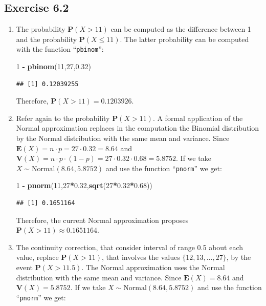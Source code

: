\documentclass[]{krantz}
\makeatletter
\newenvironment{Shaded}{\begin{snugshade}}{\end{snugshade}}
\newcommand{\DecValTok}[1]{\textcolor[rgb]{0.00,0.00,0.81}{#1}}
\newcommand{\FloatTok}[1]{\textcolor[rgb]{0.00,0.00,0.81}{#1}}
\newcommand{\KeywordTok}[1]{\textcolor[rgb]{0.13,0.29,0.53}{\textbf{#1}}}
\newcommand{\NormalTok}[1]{#1}
\newcommand{\OperatorTok}[1]{\textcolor[rgb]{0.81,0.36,0.00}{\textbf{#1}}}
\newcommand{\StringTok}[1]{\textcolor[rgb]{0.31,0.60,0.02}{#1}}
\newcommand{\Expec}{\mathbf{E}}
\newcommand{\Prob}{\mathbf{P}}
\newcommand{\Var}{\mathbf{V}}
\newenvironment{kframe}{%
\medskip{}
\setlength{\fboxsep}{.8em}
 \def\at@end@of@kframe{}%
 \ifinner\ifhmode%
  \def\at@end@of@kframe{\end{minipage}}%
  \begin{minipage}{\columnwidth}%
 \fi\fi%
 \def\FrameCommand##1{\hskip\@totalleftmargin \hskip-\fboxsep
 \colorbox{shadecolor}{##1}\hskip-\fboxsep
     \hskip-\linewidth \hskip-\@totalleftmargin \hskip\columnwidth}%
 \MakeFramed {\advance\hsize-\width
   \@totalleftmargin\z@ \linewidth\hsize
   \@setminipage}}%
 {\par\unskip\endMakeFramed%
 \at@end@of@kframe}
\renewenvironment{Shaded}{\begin{kframe}}{\end{kframe}}
\theoremstyle{definition}
\theoremstyle{definition}
\theoremstyle{definition}
\theoremstyle{remark}
\makeatother
\begin{document}
\hypertarget{exercise-6.2}{%
\subsection*{Exercise 6.2}\label{exercise-6.2}}


\begin{enumerate}
\def\labelenumi{\arabic{enumi}.}
\item
  The probability \(\Prob(X > 11)\) can be
  computed as the difference between 1 and the probability
  \(\Prob(X \leq 11)\). The latter probability can be computed with the
  function ``\texttt{pbinom}'':

\begin{Shaded}
\begin{Highlighting}[]
\DecValTok{1} \OperatorTok{-}\StringTok{ }\KeywordTok{pbinom}\NormalTok{(}\DecValTok{11}\NormalTok{,}\DecValTok{27}\NormalTok{,}\FloatTok{0.32}\NormalTok{)}
\end{Highlighting}
\end{Shaded}

\begin{verbatim}
## [1] 0.12039255
\end{verbatim}

  Therefore, \(\Prob(X > 11) = 0.1203926\).
\item
  Refer again to the probability
  \(\Prob(X > 11)\). A formal application of the Normal approximation
  replaces in the computation the Binomial distribution by the Normal
  distribution with the same mean and variance. Since
  \(\Expec(X) = n \cdot p = 27 \cdot 0.32 = 8.64\) and
  \(\Var(X) = n \cdot p \cdot (1-p) = 27 \cdot 0.32 \cdot 0.68 = 5.8752\).
  If we take \(X \sim \mbox{Normal}(8.64,5.8752)\) and use the function
  ``\texttt{pnorm}'' we get:

\begin{Shaded}
\begin{Highlighting}[]
\DecValTok{1} \OperatorTok{-}\StringTok{ }\KeywordTok{pnorm}\NormalTok{(}\DecValTok{11}\NormalTok{,}\DecValTok{27}\OperatorTok{*}\FloatTok{0.32}\NormalTok{,}\KeywordTok{sqrt}\NormalTok{(}\DecValTok{27}\OperatorTok{*}\FloatTok{0.32}\OperatorTok{*}\FloatTok{0.68}\NormalTok{))}
\end{Highlighting}
\end{Shaded}

\begin{verbatim}
## [1] 0.1651164
\end{verbatim}

  Therefore, the current Normal approximation proposes
  \(\Prob(X > 11) \approx 0.1651164\).
\item
  The continuity correction, that
  consider interval of range 0.5 about each value, replace
  \(\Prob(X > 11)\), that involves the values \(\{12, 13, \ldots, 27\}\), by
  the event \(\Prob(X > 11.5)\). The Normal approximation uses the Normal
  distribution with the same mean and variance. Since \(\Expec(X) = 8.64\)
  and \(\Var(X) = 5.8752\). If we take \(X \sim \mbox{Normal}(8.64,5.8752)\)
  and use the function ``\texttt{pnorm}'' we get:


\end{enumerate}
\end{document}
